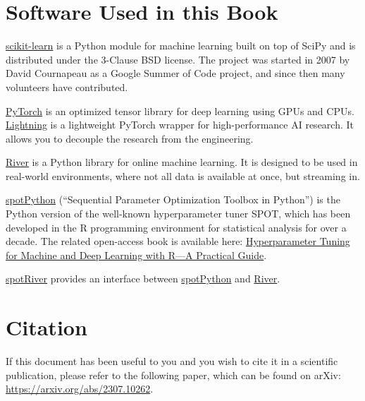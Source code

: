 \documentclass[
  letterpaper,
  DIV=11,
  numbers=noendperiod]{scrreprt}
\begin{document}
\hypertarget{software-used-in-this-book}{%
\section*{Software Used in this Book}\label{software-used-in-this-book}}


\href{https://scikit-learn.org}{scikit-learn} is a Python module for
machine learning built on top of SciPy and is distributed under the
3-Clause BSD license. The project was started in 2007 by David
Cournapeau as a Google Summer of Code project, and since then many
volunteers have contributed.

\href{https://pytorch.org}{PyTorch} is an optimized tensor library for
deep learning using GPUs and CPUs.
\href{https://lightning.ai/docs/pytorch/latest/}{Lightning} is a
lightweight PyTorch wrapper for high-performance AI research. It allows
you to decouple the research from the engineering.

\href{https://riverml.xyz}{River} is a Python library for online machine
learning. It is designed to be used in real-world environments, where
not all data is available at once, but streaming in.

\href{https://github.com/sequential-parameter-optimization/spotPython}{spotPython}
(``Sequential Parameter Optimization Toolbox in Python'') is the Python
version of the well-known hyperparameter tuner SPOT, which has been
developed in the R programming environment for statistical analysis for
over a decade. The related open-access book is available here:
\href{https://link.springer.com/book/10.1007/978-981-19-5170-1}{Hyperparameter
Tuning for Machine and Deep Learning with R---A Practical Guide}.

\href{https://github.com/sequential-parameter-optimization/spotRiver}{spotRiver}
provides an interface between
\href{https://github.com/sequential-parameter-optimization/spotPython}{spotPython}
and \href{https://riverml.xyz}{River}.

\hypertarget{citation}{%
\section*{Citation}\label{citation}}


If this document has been useful to you and you wish to cite it in a
scientific publication, please refer to the following paper, which can
be found on arXiv: \url{https://arxiv.org/abs/2307.10262}.
\end{document}

